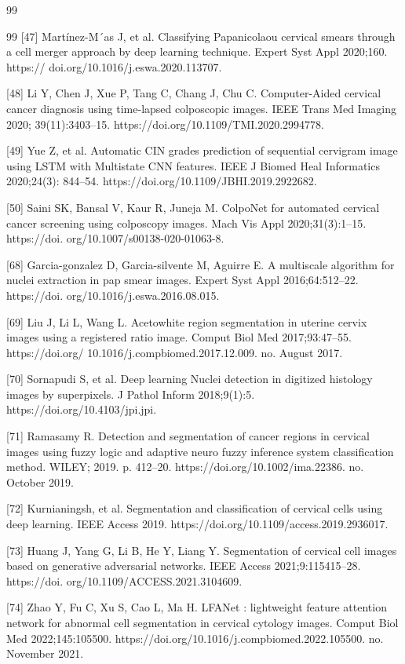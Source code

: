 \documentclass{svjour3}
\begin{document}
\begin{thebibliography}{99}
\begin{thebibliography}{99}
 [47] Martínez-M´as J, et al. Classifying Papanicolaou cervical smears through a cell merger approach by deep learning technique. Expert Syst Appl 2020;160. https:// doi.org/10.1016/j.eswa.2020.113707.

 [48] Li Y, Chen J, Xue P, Tang C, Chang J, Chu C. Computer-Aided cervical cancer diagnosis using time-lapsed colposcopic images. IEEE Trans Med Imaging 2020; 39(11):3403–15. https://doi.org/10.1109/TMI.2020.2994778.

 [49] Yue Z, et al. Automatic CIN grades prediction of sequential cervigram image using LSTM with Multistate CNN features. IEEE J Biomed Heal Informatics 2020;24(3): 844–54. https://doi.org/10.1109/JBHI.2019.2922682.

 [50] Saini SK, Bansal V, Kaur R, Juneja M. ColpoNet for automated cervical cancer screening using colposcopy images. Mach Vis Appl 2020;31(3):1–15. https://doi. org/10.1007/s00138-020-01063-8.

 [68] Garcia-gonzalez D, Garcia-silvente M, Aguirre E. A multiscale algorithm for nuclei extraction in pap smear images. Expert Syst Appl 2016;64:512–22. https://doi. org/10.1016/j.eswa.2016.08.015.

 [69] Liu J, Li L, Wang L. Acetowhite region segmentation in uterine cervix images using a registered ratio image. Comput Biol Med 2017;93:47–55. https://doi.org/ 10.1016/j.compbiomed.2017.12.009. no. August 2017.

 [70] Sornapudi S, et al. Deep learning Nuclei detection in digitized histology images by superpixels. J Pathol Inform 2018;9(1):5. https://doi.org/10.4103/jpi.jpi.

 [71] Ramasamy R. Detection and segmentation of cancer regions in cervical images using fuzzy logic and adaptive neuro fuzzy inference system classification method. WILEY; 2019. p. 412–20. https://doi.org/10.1002/ima.22386. no. October 2019.

 [72] Kurnianingsh, et al. Segmentation and classification of cervical cells using deep learning. IEEE Access 2019. https://doi.org/10.1109/access.2019.2936017.

 [73] Huang J, Yang G, Li B, He Y, Liang Y. Segmentation of cervical cell images based on generative adversarial networks. IEEE Access 2021;9:115415–28. https://doi. org/10.1109/ACCESS.2021.3104609.

 [74] Zhao Y, Fu C, Xu S, Cao L, Ma H. LFANet : lightweight feature attention network for abnormal cell segmentation in cervical cytology images. Comput Biol Med 2022;145:105500. https://doi.org/10.1016/j.compbiomed.2022.105500. no. November 2021.


\end{thebibliography}
\end{thebibliography}
\end{document}
